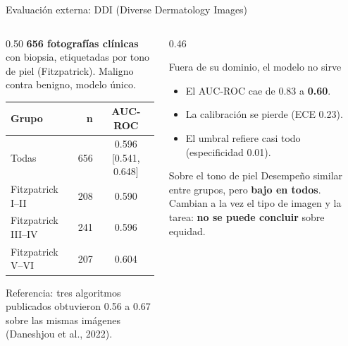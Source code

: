 \documentclass[aspectratio=169,10pt]{beamer}
\begin{document}
\begin{frame}{Evaluación externa: DDI (Diverse Dermatology Images)}
  \begin{columns}[T]
    \begin{column}{0.50\textwidth}
      \small
      \textbf{656 fotografías clínicas} con biopsia, etiquetadas por tono de piel (Fitzpatrick). Maligno contra benigno, modelo único.
      \vspace{0.5em}
      \begin{center}
        \setlength{\tabcolsep}{4pt}
        \begin{tabular}{lrc}
          \toprule
          \textbf{Grupo} & \textbf{n} & \textbf{AUC-ROC} \\
          \midrule
          Todas & 656 & 0.596 [0.541, 0.648] \\
          Fitzpatrick I--II & 208 & 0.590 \\
          Fitzpatrick III--IV & 241 & 0.596 \\
          Fitzpatrick V--VI & 207 & 0.604 \\
          \bottomrule
        \end{tabular}
      \end{center}
      \vspace{0.3em}
      Referencia: tres algoritmos publicados obtuvieron 0.56 a 0.67 sobre las mismas imágenes (Daneshjou et al., 2022).
    \end{column}
    \begin{column}{0.46\textwidth}
      \begin{alertblock}{Fuera de su dominio, el modelo no sirve}
        \begin{itemize}
          \item El AUC-ROC cae de 0.83 a \textbf{0.60}.
          \item La calibración se pierde (ECE 0.23).
          \item El umbral refiere casi todo (especificidad 0.01).
        \end{itemize}
      \end{alertblock}
      \begin{block}{Sobre el tono de piel}
        Desempeño similar entre grupos, pero \textbf{bajo en todos}. Cambian a la vez el tipo de imagen y la tarea: \textbf{no se puede concluir} sobre equidad.
      \end{block}
    \end{column}
  \end{columns}
\end{frame}
\end{document}
